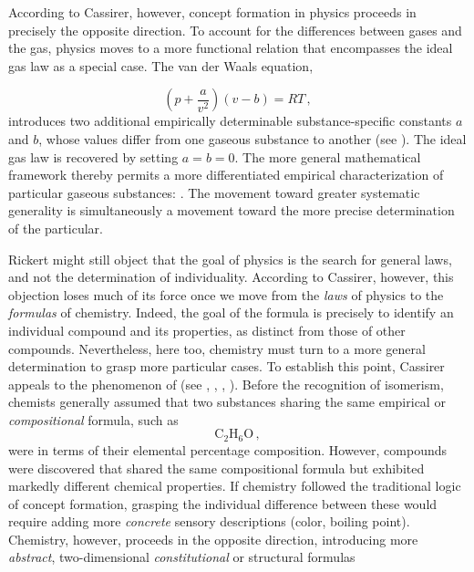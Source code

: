 \documentclass[submitted,12pt]{article}
\begin{document}
According to Cassirer, however, concept formation in physics proceeds in precisely the opposite direction. To account for the differences between  gases and the  gas, physics moves to a more  functional relation that encompasses the ideal gas law as a special case. The van der Waals equation, 

\begin{equation*}
\left(p+\frac{a}{v^2}\right)(v-b)=RT\,,
\end{equation*}
%
introduces two additional empirically determinable substance-specific constants $a$ and $b$, whose values differ from one gaseous substance to another (see ). The ideal gas law is recovered by setting $a=b=0$. The more general mathematical framework thereby permits a more differentiated empirical characterization of particular gaseous substances:  . The movement toward greater systematic generality is simultaneously a movement toward the more precise determination of the particular.

Rickert might still object that the goal of physics is the search for general laws, and not the determination of individuality. According to Cassirer, however, this objection loses much of its force once we move from the \emph{laws} of physics to the \emph{formulas} of chemistry. Indeed, the goal of the formula is precisely to identify an individual compound and its properties, as distinct from those of other compounds. Nevertheless, here too, chemistry must turn to a more general determination to grasp more particular cases. To establish this point, Cassirer appeals to the phenomenon of  (see \cite[122--24, 274--78]{Ladenburg1902}, \cite[chap.~VII]{Duhem1902}, \cite[II.III]{Wurtz1879}, \cite[lect.~IV]{Ostwald1906Leitlinien}). Before the recognition of isomerism, chemists generally assumed that two substances sharing the same empirical or \emph{compositional} formula, such as
%
\begin{equation*}
\mathrm{C}_2 \mathrm{H}_6 \mathrm{O}\,,
\end{equation*}
%
were  in terms of their elemental percentage composition. However, compounds were discovered that shared the same compositional formula but exhibited markedly different chemical properties. If chemistry followed the traditional logic of concept formation, grasping the individual difference between these  would require adding more \emph{concrete} sensory descriptions (color, boiling point\etc). Chemistry, however, proceeds in the opposite direction, introducing more \emph{abstract}, two-dimensional \emph{constitutional} or structural formulas 
\end{document}
